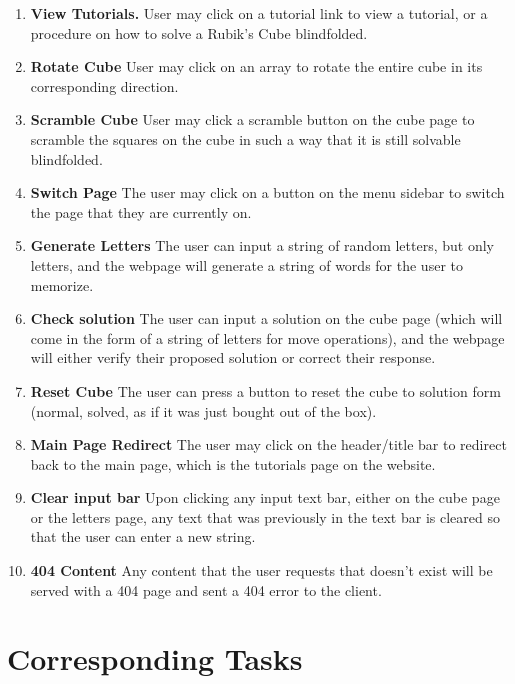 \documentclass[12pt]{article}
\begin{document}
\begin{enumerate}
	\item \textbf{View Tutorials.} User may click on a tutorial link to view a tutorial, or a procedure on how to solve a Rubik’s Cube blindfolded.
	\item \textbf{Rotate Cube} User may click on an array to rotate the entire cube in its corresponding direction.
	\item \textbf{Scramble Cube} User may click a scramble button on the cube page to scramble the squares on the cube in such a way that it is still solvable blindfolded.
	\item \textbf{Switch Page} The user may click on a button on the menu sidebar to switch the page that they are currently on.
	\item \textbf{Generate Letters} The user can input a string of random letters, but only letters, and the webpage will generate a string of words for the user to memorize.
	\item \textbf{Check solution} The user can input a solution on the cube page (which will come in the form of a string of letters for move operations), and the webpage will either verify their proposed solution or correct their response.
	\item \textbf{Reset Cube} The user can press a button to reset the cube to solution form (normal, solved, as if it was just bought out of the box).
	\item \textbf{Main Page Redirect} The user may click on the header/title bar to redirect back to the main page, which is the tutorials page on the website.
	\item \textbf{Clear input bar} Upon clicking any input text bar, either on the cube page or the letters page, any text that was previously in the text bar is cleared so that the user can enter a new string.
	\item \textbf{404 Content} Any content that the user requests that doesn’t exist will be served with a 404 page and sent a 404 error to the client.
\end{enumerate}
	
\section{Corresponding Tasks}
\end{document}
